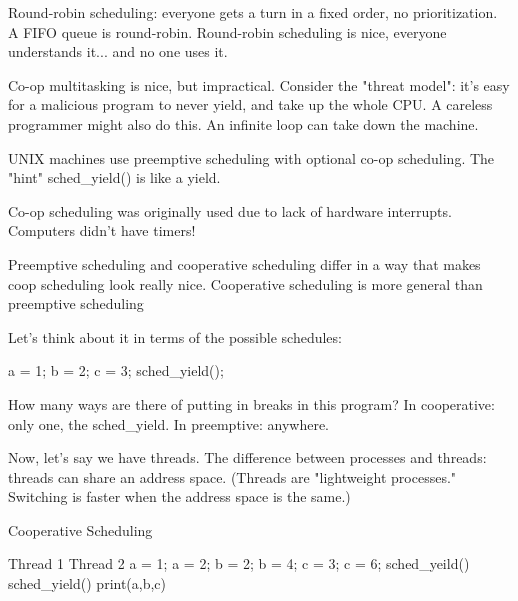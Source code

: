 \documentclass[twoside]{article}
\begin{document}
Round-robin scheduling: everyone gets a turn in a fixed order, no prioritization. A FIFO queue is round-robin. Round-robin scheduling is nice, everyone understands it... and no one uses it.

Co-op multitasking is nice, but impractical. Consider the "threat model": it's easy for a malicious program to never yield, and take up the whole CPU. A careless programmer might also do this. An infinite loop can take down the machine.

UNIX machines use preemptive scheduling with optional co-op scheduling. The "hint" sched\_yield() is like a yield.

Co-op scheduling was originally used due to lack of hardware interrupts. Computers didn't have timers!

Preemptive scheduling and cooperative scheduling differ in a way that makes coop scheduling look really nice. Cooperative scheduling is more general than preemptive scheduling

Let's think about it in terms of the possible schedules:

a = 1; \newline
b = 2; \newline
c = 3; \newline
sched\_yield(); \newline

How many ways are there of putting in breaks in this program? \newline
In cooperative: only one, the sched\_yield. \newline
In preemptive: anywhere. \newline

Now, let's say we have threads. The difference between processes and threads: threads can share an address space. (Threads are "lightweight processes." Switching is faster when the address space is the same.)

Cooperative Scheduling  \newline

Thread 1 \hspace{30 mm}                                  Thread 2 \newline
a  =  1;   \hspace{36 mm}                                    a = 2;\newline
b  =  2;   \hspace{36 mm}                                    b = 4;\newline
c  =  3;   \hspace{36 mm}                                    c = 6;\newline
sched\_yeild() \hspace{26 mm}                                 sched\_yield()\newline
print(a,b,c)\newline
\end{document}
